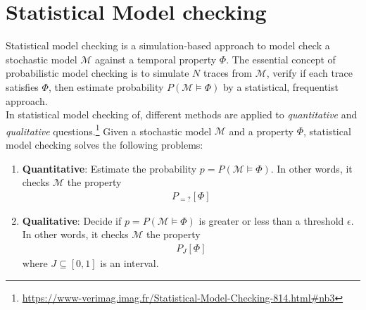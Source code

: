 \section{Statistical Model checking}
Statistical model checking is a simulation-based approach to model check a stochastic model
$\mathcal{M}$ against a temporal property $\Phi$. The essential concept of probabilistic model
checking is to simulate $N$ traces from $\mathcal{M}$, verify if each trace satisfies $\Phi$, then
estimate probability $P(\mathcal{M}\models\Phi)$ by a statistical, frequentist approach.\\
In statistical model checking of, different methods are applied to \textit{quantitative} and
\textit{qualitative}
questions.\footnote{\url{https://www-verimag.imag.fr/Statistical-Model-Checking-814.html\#nb3}}
Given a stochastic model $\mathcal{M}$ and a property $\Phi$, statistical model checking solves the
following problems:
\begin{enumerate}
    \item \textbf{Quantitative}: Estimate the probability $p = P(\mathcal{M}\models\Phi)$. In other
          words, it checks $\mathcal{M}$ the property \begin{align*}
              P_{=?}[ \Phi ]
          \end{align*}
    \item \textbf{Qualitative}: Decide if $p = P(\mathcal{M}\models\Phi)$ is greater or less than a threshold $\epsilon$. In other
          words, it checks $\mathcal{M}$ the property \begin{align*}
              P_J[ \Phi ]
          \end{align*}
          where $J\subseteq[0,1]$ is an interval.
\end{enumerate}

